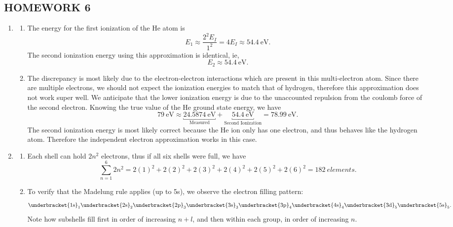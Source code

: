 \documentclass[10pt]{article}
\begin{document}

\begin{centering}
  \section*{HOMEWORK 6}
\end{centering}

\begin{enumerate}
\item 
  \begin{enumerate}
  \item 
    The energy for the first ionization of the He atom is 
   \[
     E_1 \approx \frac{2^2E_I}{1^2} = 4 E_I \approx \qty{54.4}{\electronvolt}
   .\]
   The second ionization energy using this approximation is identical, ie,
   \[
     E_2 \approx \qty{54.4}{\electronvolt}
   .\]
  \item
    The discrepancy is most likely due to the electron-electron interactions which are present in this multi-electron atom.
    Since there are multiple electrons, we should not expect the ionization energies to match that of hydrogen, therefore this approximation does not work super well.
    We anticipate that the lower ionization energy is due to the unaccounted repulsion from the coulomb force of the second electron.
    Knowing the true value of the He ground state energy, we have 
    \[
      \qty{79}{\electronvolt} \approx \underbracket{\qty{24.5874}{\electronvolt}}_{\text{Measured}} + \underbracket{\qty{54.4}{\electronvolt}}_{\text{Second Ionization}} = \qty{78.99}{\electronvolt}
    .\]
    The second ionization energy is most likely correct because the He ion only has one electron, and thus behaves like the hydrogen atom.
    Therefore the independent electron approximation works in this case.
  \end{enumerate}
\item
  \begin{enumerate}
  \item
    Each shell can hold $ 2n^2 $ electrons, thus if all six shells were full, we have 
    \[
      \sum_{n=1}^{6} 2n^2 = 2 \left( 1 \right)^2 + 2 \left( 2 \right)^2 + 2 \left( 3 \right)^2 + 2 \left( 4 \right)^2 + 2 \left( 5 \right)^2 + 2 \left( 6 \right)^2 = \qty{182}{elements}
    .\]
  \item
    To verify that the Madelung rule applies (up to 5s), we observe the electron filling pattern:
    \[
      \underbracket{\vphantom{p}1\text{s}}_{1}\underbracket{\vphantom{p}2\text{s}}_{2}\underbracket{2\text{p}}_{3}\underbracket{\vphantom{p}3\text{s}}_{3}\underbracket{3\text{p}}_{4}\underbracket{\vphantom{p}4\text{s}}_{4}\underbracket{\vphantom{p}3\text{d}}_{5}\underbracket{\vphantom{p}5\text{s}}_{5}
    .\]
    Note how subshells fill first in order of increasing $ n+l $, and then within each group, in order of increasing $ n $.
    

\end{enumerate}
\end{enumerate}
\end{document}
